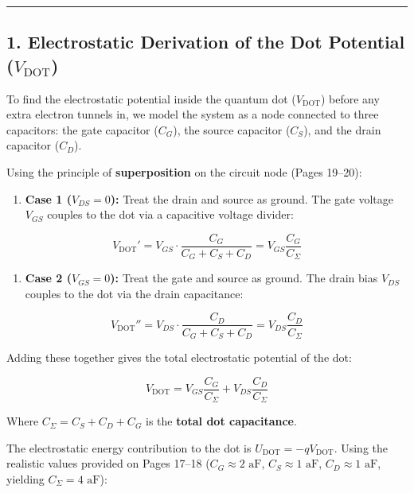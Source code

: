 \documentclass[
]{article}
\providecommand{\tightlist}{%
  \setlength{\itemsep}{0pt}\setlength{\parskip}{0pt}}
\begin{document}
\begin{center}\rule{0.5\linewidth}{0.5pt}\end{center}

\subsection{\texorpdfstring{1. Electrostatic Derivation of the Dot
Potential
(\(V_{\text{DOT}}\))}{1. Electrostatic Derivation of the Dot Potential (V\_\{\textbackslash text\{DOT\}\})}}\label{electrostatic-derivation-of-the-dot-potential-v_textdot}

To find the electrostatic potential inside the quantum dot
(\(V_{\text{DOT}}\)) before any extra electron tunnels in, we model the
system as a node connected to three capacitors: the gate capacitor
(\(C_G\)), the source capacitor (\(C_S\)), and the drain capacitor
(\(C_D\)).

Using the principle of \textbf{superposition} on the circuit node (Pages
19--20):

\begin{enumerate}
\def\labelenumi{\arabic{enumi}.}
\tightlist
\item
  \textbf{Case 1 (\(V_{DS} = 0\)):} Treat the drain and source as
  ground. The gate voltage \(V_{GS}\) couples to the dot via a
  capacitive voltage divider:
\end{enumerate}

\[V_{\text{DOT}}' = V_{GS} \cdot \frac{C_G}{C_G + C_S + C_D} = V_{GS} \frac{C_G}{C_{\Sigma}}\]

\begin{enumerate}
\def\labelenumi{\arabic{enumi}.}
\setcounter{enumi}{1}
\tightlist
\item
  \textbf{Case 2 (\(V_{GS} = 0\)):} Treat the gate and source as ground.
  The drain bias \(V_{DS}\) couples to the dot via the drain
  capacitance:
\end{enumerate}

\[V_{\text{DOT}}'' = V_{DS} \cdot \frac{C_D}{C_G + C_S + C_D} = V_{DS} \frac{C_D}{C_{\Sigma}}\]

Adding these together gives the total electrostatic potential of the
dot:

\[V_{\text{DOT}} = V_{GS}\frac{C_G}{C_{\Sigma}} + V_{DS}\frac{C_D}{C_{\Sigma}}\]

Where \(C_{\Sigma} = C_S + C_D + C_G\) is the \textbf{total dot
capacitance}.

The electrostatic energy contribution to the dot is
\(U_{\text{DOT}} = -q V_{\text{DOT}}\). Using the realistic values
provided on Pages 17--18 (\(C_G \approx 2\text{ aF}\),
\(C_S \approx 1\text{ aF}\), \(C_D \approx 1\text{ aF}\), yielding
\(C_{\Sigma} = 4\text{ aF}\)):
\end{document}
